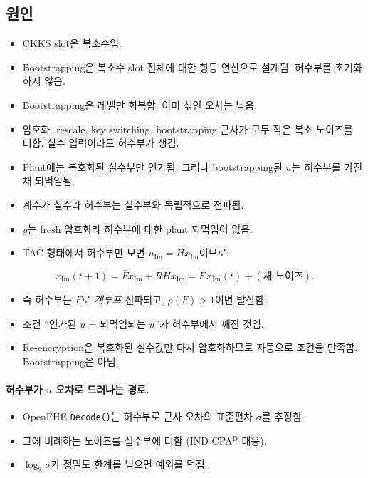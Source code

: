 \documentclass[11pt,a4paper]{article}
\renewcommand{\Im}{\operatorname{Im}}
\newcommand{\Fb}{\bar F}
\begin{document}
\subsection{원인}
\begin{itemize}
\item CKKS slot은 복소수임.
\item Bootstrapping은 복소수 slot 전체에 대한 항등 연산으로 설계됨. 허수부를 초기화하지 않음.
\item Bootstrapping은 레벨만 회복함. 이미 섞인 오차는 남음.
\item 암호화, rescale, key switching, bootstrapping 근사가 모두 작은 복소 노이즈를 더함. 실수 입력이라도 허수부가 생김.
\item Plant에는 복호화된 실수부만 인가됨. 그러나 bootstrapping된 $u$는 허수부를 가진 채 되먹임됨.
\item 계수가 실수라 허수부는 실수부와 독립적으로 전파됨.
\item $y$는 fresh 암호화라 허수부에 대한 plant 되먹임이 없음.
\item TAC 형태에서 허수부만 보면 $u_{\Im}=Hx_{\Im}$이므로:
\end{itemize}
\begin{equation}
x_{\Im}(t+1)=\Fb x_{\Im}+RHx_{\Im}=F\,x_{\Im}(t)+(\text{새 노이즈}).
\end{equation}
\begin{itemize}
\item 즉 허수부는 $F$로 \emph{개루프} 전파되고, $\rho(F)>1$이면 발산함.
\item 조건 ``인가된 $u$ = 되먹임되는 $u$''가 허수부에서 깨진 것임.
\item Re-encryption은 복호화된 실수값만 다시 암호화하므로 자동으로 조건을 만족함. Bootstrapping은 아님.
\end{itemize}

\paragraph{허수부가 $u$ 오차로 드러나는 경로.}
\begin{itemize}
\item OpenFHE \texttt{Decode()}는 허수부로 근사 오차의 표준편차 $\sigma$를 추정함.
\item 그에 비례하는 노이즈를 실수부에 더함 (IND-CPA$^{\mathrm D}$ 대응).
\item $\log_2\sigma$가 정밀도 한계를 넘으면 예외를 던짐.
\end{itemize}
\end{document}
